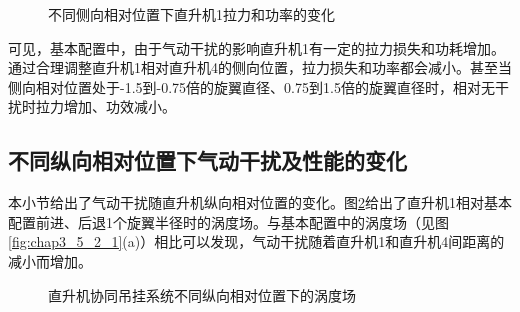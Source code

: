 \begin{figure}[!htb]
  \centering
  \quad 
  \caption{不同侧向相对位置下直升机1拉力和功率的变化}
  \label{fig:chap3_5_2_3}
\end{figure}

可见，基本配置中，由于气动干扰的影响直升机1有一定的拉力损失和功耗增加。通过合理调整直升机1相对直升机4的侧向位置，拉力损失和功率都会减小。甚至当侧向相对位置处于-1.5到-0.75倍的旋翼直径、0.75到1.5倍的旋翼直径时，相对无干扰时拉力增加、功效减小。
\subsection{不同纵向相对位置下气动干扰及性能的变化}
本小节给出了气动干扰随直升机纵向相对位置的变化。图\ref{fig:chap3_5_3_1}给出了直升机1相对基本配置前进、后退1个旋翼半径时的涡度场。与基本配置中的涡度场（见图\ref{fig:chap3_5_2_1}(a)）相比可以发现，气动干扰随着直升机1和直升机4间距离的减小而增加。
\begin{figure}[!htb]
  \centering
  \quad 
  \caption{直升机协同吊挂系统不同纵向相对位置下的涡度场}
  \label{fig:chap3_5_3_1}
\end{figure}

